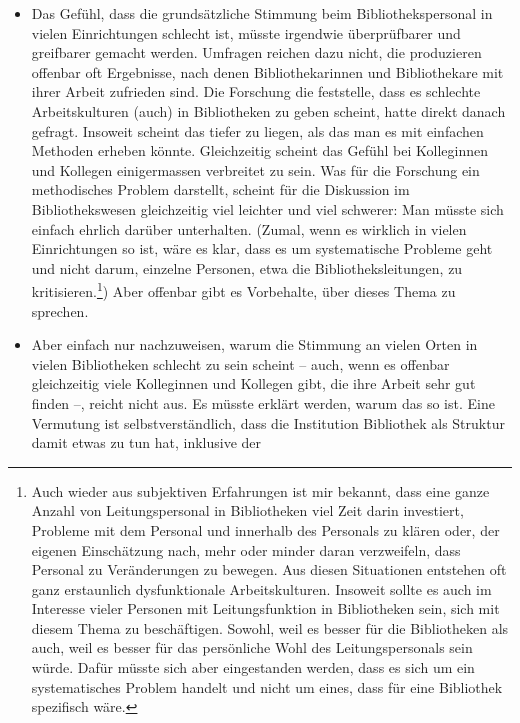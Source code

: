 \documentclass[a4paper,
fontsize=11pt,
oneside,
numbers=noperiodatend,
parskip=half-,
bibliography=totoc,
final
]{scrartcl}
\begin{document}
\begin{itemize}
\item
  Das Gefühl, dass die grundsätzliche Stimmung beim Bibliothekspersonal
  in vielen Einrichtungen schlecht ist, müsste irgendwie überprüfbarer
  und greifbarer gemacht werden. Umfragen reichen dazu nicht, die
  produzieren offenbar oft Ergebnisse, nach denen Bibliothekarinnen und
  Bibliothekare mit ihrer Arbeit zufrieden sind. Die Forschung die
  feststelle, dass es schlechte Arbeitskulturen (auch) in Bibliotheken
  zu geben scheint, hatte direkt danach gefragt. Insoweit scheint das
  tiefer zu liegen, als das man es mit einfachen Methoden erheben
  könnte. Gleichzeitig scheint das Gefühl bei Kolleginnen und Kollegen
  einigermassen verbreitet zu sein. Was für die Forschung ein
  methodisches Problem darstellt, scheint für die Diskussion im
  Bibliothekswesen gleichzeitig viel leichter und viel schwerer: Man
  müsste sich einfach ehrlich darüber unterhalten. (Zumal, wenn es
  wirklich in vielen Einrichtungen so ist, wäre es klar, dass es um
  systematische Probleme geht und nicht darum, einzelne Personen, etwa
  die Bibliotheksleitungen, zu kritisieren.\footnote{Auch wieder aus
    subjektiven Erfahrungen ist mir bekannt, dass eine ganze Anzahl von
    Leitungspersonal in Bibliotheken viel Zeit darin investiert,
    Probleme mit dem Personal und innerhalb des Personals zu klären
    oder, der eigenen Einschätzung nach, mehr oder minder daran
    verzweifeln, dass Personal zu Veränderungen zu bewegen. Aus diesen
    Situationen entstehen oft ganz erstaunlich dysfunktionale
    Arbeitskulturen. Insoweit sollte es auch im Interesse vieler
    Personen mit Leitungsfunktion in Bibliotheken sein, sich mit diesem
    Thema zu beschäftigen. Sowohl, weil es besser für die Bibliotheken
    als auch, weil es besser für das persönliche Wohl des
    Leitungspersonals sein würde. Dafür müsste sich aber eingestanden
    werden, dass es sich um ein systematisches Problem handelt und nicht
    um eines, dass für eine Bibliothek spezifisch wäre.}) Aber offenbar
  gibt es Vorbehalte, über dieses Thema zu sprechen.
\item
  Aber einfach nur nachzuweisen, warum die Stimmung an vielen Orten in
  vielen Bibliotheken schlecht zu sein scheint -- auch, wenn es offenbar
  gleichzeitig viele Kolleginnen und Kollegen gibt, die ihre Arbeit sehr
  gut finden --, reicht nicht aus. Es müsste erklärt werden, warum das
  so ist. Eine Vermutung ist selbstverständlich, dass die Institution
  Bibliothek als Struktur damit etwas zu tun hat, inklusive der

\end{itemize}
\end{document}
